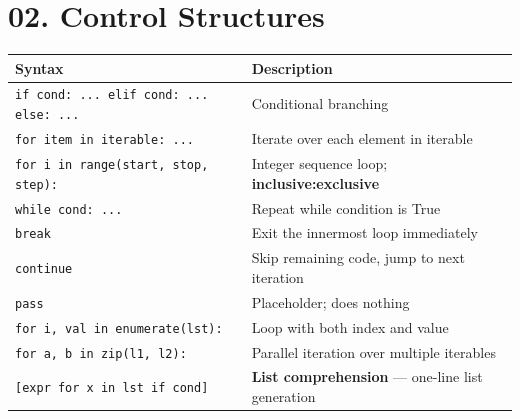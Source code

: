 \documentclass[11pt,a4paper]{report}
\let\oldtexttt\texttt
\renewcommand{\texttt}[1]{\textcolor{mainblue}{\oldtexttt{#1}}}
\begin{document}
\section*{02. Control Structures}
\small\renewcommand{\arraystretch}{1.3}
\centering
\begin{tabularx}{\textwidth}{@{}lX@{}}
\toprule
\textbf{Syntax} & \textbf{Description} \\ \midrule
\texttt{if cond: ... elif cond: ... else: ...} & Conditional branching \\
\texttt{for item in iterable: ...} & Iterate over each element in iterable \\
\texttt{for i in range(start, stop, step):} & Integer sequence loop; \textbf{inclusive:exclusive} \\
\texttt{while cond: ...} & Repeat while condition is True \\
\texttt{break} & Exit the innermost loop immediately \\
\texttt{continue} & Skip remaining code, jump to next iteration \\
\texttt{pass} & Placeholder; does nothing \\
\texttt{for i, val in enumerate(lst):} & Loop with both index and value \\
\texttt{for a, b in zip(l1, l2):} & Parallel iteration over multiple iterables \\
\texttt{[expr for x in lst if cond]} & \textbf{List comprehension} --- one-line list generation \\
\bottomrule
\end{tabularx}
\normalsize

\end{document}
